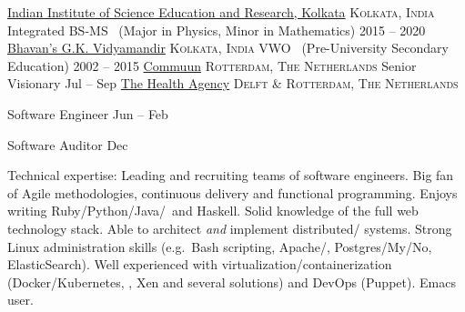 \documentclass[10pt,a4paper]{article}
\begin{document}
\spacedhrule{0em}{-0.4em}
\headedsection
  {\href{http://www.iiserkol.ac.in}{Indian Institute of Science Education and Research, Kolkata}}
  {\textsc{Kolkata, India}} {%
  \headedsubsection
    {Integrated BS-MS \textnormal{~(Major in Physics, Minor in Mathematics)}}
    {2015 -- 2020}
    {}
}
\headedsection
  {\href{https://bhavansgkvidyamandir.edu.in/}{Bhavan's G.K. Vidyamandir}}
  {\textsc{Kolkata, India}} {%
  \headedsubsection
    {VWO \textnormal{~(Pre-University Secondary Education)}}
    {2002 -- 2015}
    {}
}
\spacedhrule{0.5em}{-0.4em}
\headedsection
  {\href{http://www.commuun.nl}{Commuun}}
  {\textsc{Rotterdam, The Netherlands}} {%
  \headedsubsection
    {Senior Visionary}
    {Jul  -- Sep }
    {}
}
\headedsection
  {
    \href{http://www.thehealthagency.com}{The Health Agency}
  }
  {\textsc{Delft \& Rotterdam, The Netherlands}} {%

  \headedsubsection
    {Software Engineer}
    {Jun  -- Feb }
    {}

  \headedsubsection
    {Software Auditor}
    {Dec }
    {}
}
\vspace{-0.2em}
\spacedhrule{-0.2em}{-0.4em}


\inlineheadsection  %
  {Technical expertise:}
  {Leading and recruiting teams of software engineers.  Big fan of Agile methodologies, continuous delivery and functional programming.  Enjoys writing Ruby/\nsp Python/\nsp Java/\nsp \CPP~and Haskell.  Solid knowledge of the full web technology stack.  Able to architect \textit{and} implement distributed/ systems.  Strong Linux administration skills (e.g.\ Bash scripting, Apache/, Postgres/My/No, ElasticSearch).  Well experienced with virtualization/containerization (Docker/Kubernetes, , Xen and several  solutions) and DevOps (Puppet).  Emacs user.}
\end{document}
